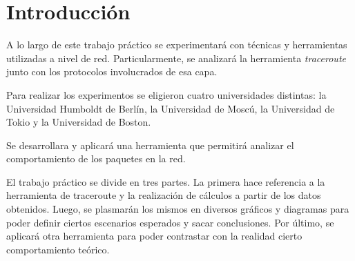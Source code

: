 \section{Introducción}


A lo largo de este trabajo práctico se experimentará con técnicas
y herramientas utilizadas a nivel de red. Particularmente, se analizará
la herramienta \textit{traceroute} junto con los protocolos involucrados de esa capa. 

Para realizar los experimentos se eligieron cuatro universidades distintas: la Universidad Humboldt de Berlín, la Universidad de Moscú,
la Universidad de Tokio y la Universidad de Boston.

Se desarrollara y aplicará una herramienta que permitirá analizar el comportamiento de los paquetes en la red. 

El trabajo práctico se divide en tres partes. La primera hace referencia a la herramienta de traceroute y la 
realización de cálculos a partir de los datos obtenidos. Luego, se plasmarán los mismos en diversos gráficos y diagramas para poder definir 
ciertos escenarios esperados y sacar conclusiones. Por último, se aplicará otra herramienta para poder contrastar con la realidad cierto comportamiento teórico. 
